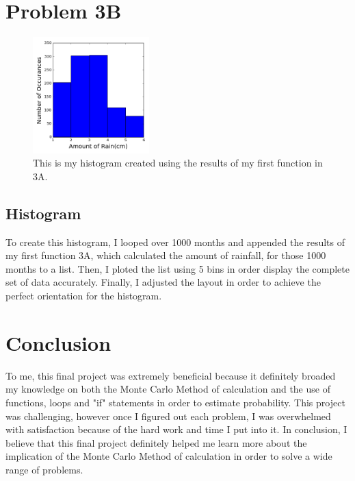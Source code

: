 \documentclass[onecolumn]{revtex4}
\begin{document}

\section{Problem 3B}

\begin{figure}[h]

	\centering
	\includegraphics[width=0.4\textwidth]{Final_Histogram.png}
	\caption{This is my histogram created using the results of my first function in 3A.}


\end{figure}

\subsection{Histogram}

	To create this histogram, I looped over 1000 months and appended the results of my first function 3A, which calculated the amount of rainfall, for those 1000 months to a list. Then, I ploted the list using 5 bins in order display the complete set of data accurately. Finally, I adjusted the layout in order to achieve the perfect orientation for the histogram.


\section{Conclusion}

	To me, this final project was extremely beneficial because it definitely broaded my knowledge on both the Monte Carlo Method of calculation and the use of functions, loops and "if" statements in order to estimate probability. This project was challenging, however once I figured out each problem, I was overwhelmed with satisfaction because of the hard work and time I put into it. In conclusion, I believe that this final project definitely helped me learn more about the implication of the Monte Carlo Method of calculation in order to solve a wide range of problems.

	
\end{document}
